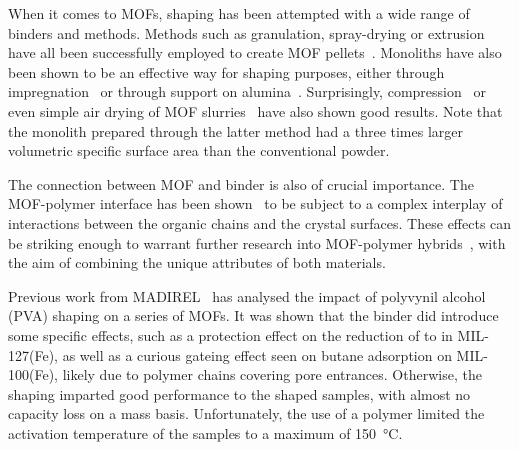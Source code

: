 When it comes to MOFs, shaping has been attempted with a wide range
of binders and methods. 
Methods such as granulation, spray-drying or extrusion have
all been successfully employed to create MOF
pellets~\cite{kaskelChemistryMetalorganicFrameworks2016}.
Monoliths have also been shown to be an effective way for shaping purposes,
either through impregnation~\cite{ramos-fernandezMOFsMeetMonoliths2011} 
or through support on alumina~\cite{aguadoFacileShapingImidazolatebased2010}.
Surprisingly, compression~\cite{bazer-bachiIndustrialUseMetalorganic2014} or
even simple air drying of MOF 
slurries~\cite{tianMechanicallyChemicallyRobust2015}
have also shown good results. Note that the monolith prepared 
through the latter method had a three times larger volumetric 
specific surface area than the conventional powder.

The connection between MOF and binder is also of crucial importance. 
The MOF-polymer interface has been 
shown~\cite{seminoMicroscopicModelMetal2016} to be
subject to a complex interplay of interactions between the organic
chains and the crystal surfaces. These effects can be striking enough 
to warrant further research into MOF-polymer 
hybrids~\cite{kitaoHybridizationMOFsPolymers2017}, with the aim 
of combining the unique attributes of both materials.

Previous work from MADIREL~\cite{chanutObservingEffectsShaping2016} 
has analysed the impact of polyvynil alcohol (PVA) shaping on a series 
of MOFs. It was shown that the binder did introduce some specific 
effects, such as a protection effect on the reduction of  to
 in MIL-127(Fe), as well as a curious gateing effect seen on 
butane adsorption on MIL-100(Fe), likely due to polymer chains covering 
pore entrances. Otherwise, the shaping imparted good performance to the
shaped samples, with almost no capacity loss on
a mass basis. Unfortunately, the use of a polymer limited the 
activation temperature of the samples to a maximum of 
\SI{150}{\degreeCelsius}.